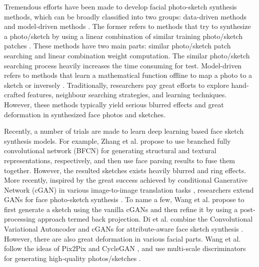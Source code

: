 \documentclass[journal]{IEEEtran}
\begin{document}
Tremendous efforts have been made to develop facial photo-sketch synthesis methods, which can be broadly classified into two groups: data-driven methods and model-driven methods \cite{Wang2017Data}.
The former refers to methods that try to synthesize a photo/sketch by using a linear combination of similar training photo/sketch patches \cite{AddRef04, Song2017Stylizing, Gao2012Face, Song2014Real, Pan2012Semi, Wang2009Face}. These methods have two main parts: similar photo/sketch patch searching and linear combination weight computation. The similar photo/sketch searching process heavily increases the time consuming for test.  
Model-driven refers to methods that learn a mathematical function offline to map a photo to a sketch or inversely \cite{Peng2016Multiple, Zhang2015Face, Zhang2016Robust, Wang2013Transductive}. Traditionally, researchers pay great efforts to explore hand-crafted features, neighbour searching strategies, and learning techniques.
However, these methods typically yield serious blurred effects and great deformation in synthesized face photos and sketches.

Recently, a number of trials are made to learn deep learning \cite{Yu2017TCYB} based face sketch synthesis models. For example, 
Zhang et al. \cite{Zhang2016Content} propose to use branched fully convolutional network (BFCN) for generating structural and textural representations, respectively, and then use face parsing results to fuse them together. However, the resulted sketches exists heavily blurred and ring effects.
More recently, inspired by the great success achieved by conditional Ganerative Network (cGAN) \cite{Krizhevsky2012ImageNet,Goodfellow2014GAN,Tembine2019GANTC} in various image-to-image translation tasks \cite{Johnson2016Perceptual,li2019CASI}, researchers extend GANs for face photo-sketch synthesis \cite{wang2017bpgan,Di2017VAEGAN,Zhang2018IJCAI}.
To name a few, 
Wang et al. \cite{wang2017bpgan} propose to first generate a sketch using the vanilla cGANs \cite{Isola2017Pix2Pix} and then refine it by using a post-processing approach termed back projection. Di et al. combine the Convolutional Variational Autoncoder and cGANs for attribute-aware face sketch synthesis \cite{Di2017VAEGAN}. However, there are also great deformation in various facial parts. Wang et al. follow the ideas of Pix2Pix \cite{Isola2017Pix2Pix} and CycleGAN \cite{Zhu2017CycleGAN}, and use multi-scale discriminators for generating high-quality photos/sketches \cite{wang2017multgan}. 
\end{document}
